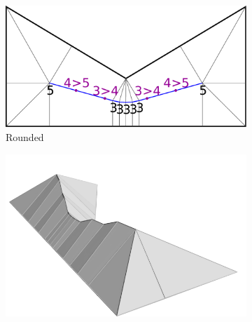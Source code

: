 \begin{figure}
\begin{subfigure}{\figwidth}
\includegraphics[width=\figwidthTwo]{sources/method/surface/rounded.pdf}
\caption{Rounded}\label{3d_surface_overview_rounded}
\end{subfigure}
\begin{subfigure}{\figwidth}\centering
\hspace*{\tempheightTwo}
\includegraphics[width=\figwidthTree]{sources/method/surface/smoothed_cropped.png}

\vspace{\tempheight}


\end{subfigure}
\end{figure}
